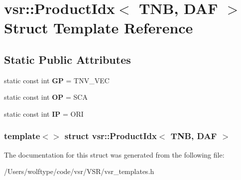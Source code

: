\hypertarget{structvsr_1_1_product_idx_3_01_t_n_b_00_01_d_a_f_01_4}{\section{vsr\-:\-:Product\-Idx$<$ T\-N\-B, D\-A\-F $>$ Struct Template Reference}
\label{structvsr_1_1_product_idx_3_01_t_n_b_00_01_d_a_f_01_4}
}
\subsection*{Static Public Attributes}
\begin{DoxyCompactItemize}
\item 
\hypertarget{structvsr_1_1_product_idx_3_01_t_n_b_00_01_d_a_f_01_4_ab9e149913329954e778f7a8d4c04bceb}{static const int {\bfseries G\-P} = T\-N\-V\-\_\-\-V\-E\-C}\label{structvsr_1_1_product_idx_3_01_t_n_b_00_01_d_a_f_01_4_ab9e149913329954e778f7a8d4c04bceb}

\item 
\hypertarget{structvsr_1_1_product_idx_3_01_t_n_b_00_01_d_a_f_01_4_a7c54a2d11be0981b11a7695056f3d942}{static const int {\bfseries O\-P} = S\-C\-A}\label{structvsr_1_1_product_idx_3_01_t_n_b_00_01_d_a_f_01_4_a7c54a2d11be0981b11a7695056f3d942}

\item 
\hypertarget{structvsr_1_1_product_idx_3_01_t_n_b_00_01_d_a_f_01_4_aa2eb786d9e4fa95d2b5de5e6bd937c0d}{static const int {\bfseries I\-P} = O\-R\-I}\label{structvsr_1_1_product_idx_3_01_t_n_b_00_01_d_a_f_01_4_aa2eb786d9e4fa95d2b5de5e6bd937c0d}

\end{DoxyCompactItemize}
\subsubsection*{template$<$$>$ struct vsr\-::\-Product\-Idx$<$ T\-N\-B, D\-A\-F $>$}



The documentation for this struct was generated from the following file\-:\begin{DoxyCompactItemize}
\item 
/\-Users/wolftype/code/vsr/\-V\-S\-R/vsr\-\_\-templates.\-h\end{DoxyCompactItemize}

